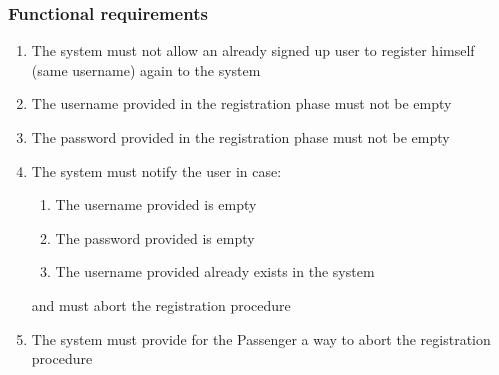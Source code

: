 \subsubsection{Functional requirements}
\begin{enumerate}
\item The system must not allow an already signed up user to register himself (same username) again to the system
\item The username provided in the registration phase must not be empty
\item The password provided in the registration phase must not be empty
\item The system must notify the user in case: 
	\begin{enumerate}
	\item The username provided is empty
	\item The password provided is empty
	\item The username provided already exists in the system
	\end{enumerate}
	and must abort the registration procedure
\item The system must provide for the Passenger a way to abort the registration procedure
\end{enumerate}